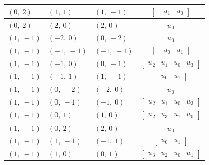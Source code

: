 \documentclass[11pt]{article}
\theoremstyle{definition}
\begin{document}
\begin{longtable}{|l|l|l|c|}
    \hline
    $\left( 0, \  2\right)$ & $\left( 1, \  1\right)$ & $\left( 1, \  -1\right)$ & $\left[\begin{matrix}- u_{1} & u_{0}\end{matrix}\right]$ \\
    \hline
    $\left( 0, \  2\right)$ & $\left( 2, \  0\right)$ & $\left( 2, \  0\right)$ & $u_{0}$ \\
    \hline
    $\left( 1, \  -1\right)$ & $\left( -2, \  0\right)$ & $\left( 0, \  -2\right)$ & $u_{0}$ \\
    \hline
    $\left( 1, \  -1\right)$ & $\left( -1, \  -1\right)$ & $\left( -1, \  -1\right)$ & $\left[\begin{matrix}- u_{0} & u_{1}\end{matrix}\right]$ \\
    \hline
    $\left( 1, \  -1\right)$ & $\left( -1, \  0\right)$ & $\left( 0, \  -1\right)$ & $\left[\begin{matrix}u_{2} & u_{1} & u_{0} & u_{3}\end{matrix}\right]$ \\
    \hline
    $\left( 1, \  -1\right)$ & $\left( -1, \  1\right)$ & $\left( 1, \  -1\right)$ & $\left[\begin{matrix}u_{0} & u_{1}\end{matrix}\right]$ \\
    \hline
    $\left( 1, \  -1\right)$ & $\left( 0, \  -2\right)$ & $\left( -2, \  0\right)$ & $u_{0}$ \\
    \hline
    $\left( 1, \  -1\right)$ & $\left( 0, \  -1\right)$ & $\left( -1, \  0\right)$ & $\left[\begin{matrix}u_{2} & u_{1} & u_{0} & u_{3}\end{matrix}\right]$ \\
    \hline
    $\left( 1, \  -1\right)$ & $\left( 0, \  1\right)$ & $\left( 1, \  0\right)$ & $\left[\begin{matrix}u_{2} & u_{3} & u_{1} & u_{0}\end{matrix}\right]$ \\
    \hline
    $\left( 1, \  -1\right)$ & $\left( 0, \  2\right)$ & $\left( 2, \  0\right)$ & $u_{0}$ \\
    \hline
    $\left( 1, \  -1\right)$ & $\left( 1, \  -1\right)$ & $\left( -1, \  1\right)$ & $\left[\begin{matrix}u_{0} & u_{1}\end{matrix}\right]$ \\
    \hline
    $\left( 1, \  -1\right)$ & $\left( 1, \  0\right)$ & $\left( 0, \  1\right)$ & $\left[\begin{matrix}u_{3} & u_{2} & u_{0} & u_{1}\end{matrix}\right]$ \\

\end{longtable}
\end{document}
